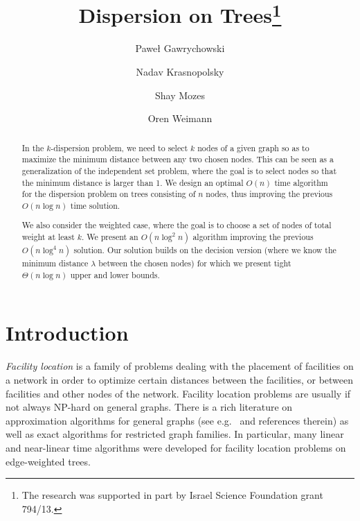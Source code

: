 \documentclass[11pt,a4paper]{article}
\newcommand{\Oh}{{O}}
\theoremstyle{definition}
\theoremstyle{remark}
\begin{document}
\title{Dispersion on Trees\thanks{The research was supported in part by Israel Science Foundation grant 794/13.}}
\author[1]{Pawe\l{} Gawrychowski}
\author[1]{Nadav Krasnopolsky}
\author[2]{Shay Mozes}
\author[1]{Oren Weimann}


\date{}
\maketitle

\begin{abstract}
In the $k$-dispersion problem, we need to select $k$ nodes of a given graph so as to maximize
the minimum distance between any two chosen nodes. This can be seen as a generalization
of the independent set problem, where the goal is to select nodes so that the minimum distance
is larger than 1.
We design an optimal $\Oh(n)$ time algorithm for the dispersion problem on trees consisting
of $n$ nodes, thus improving the previous $\Oh(n\log n)$ time solution. 

We also consider the weighted case, where the goal is to choose a set of nodes of total weight at least $k$. We present an $\Oh(n\log^2n)$ algorithm improving the previous $\Oh(n\log^4 n)$ solution. Our solution builds on the decision version (where we know the minimum distance $\lambda$ between the chosen nodes) for which we present tight $\Theta(n\log n)$ upper and lower bounds. 
\end{abstract}

\section{Introduction}

\emph{Facility location} is a family of problems dealing with the placement of facilities on a network in order to optimize certain distances between the facilities, or between facilities and other nodes of the network. Facility location problems are usually if not always NP-hard on general graphs. There is a rich literature on approximation algorithms for general graphs (see e.g.~\cite{DavidB.Shmoys1997,Vazirani2003} and references therein) as well as exact algorithms for restricted graph families. In particular, many linear and near-linear time algorithms were developed for facility location problems on edge-weighted trees.   
\end{document}
